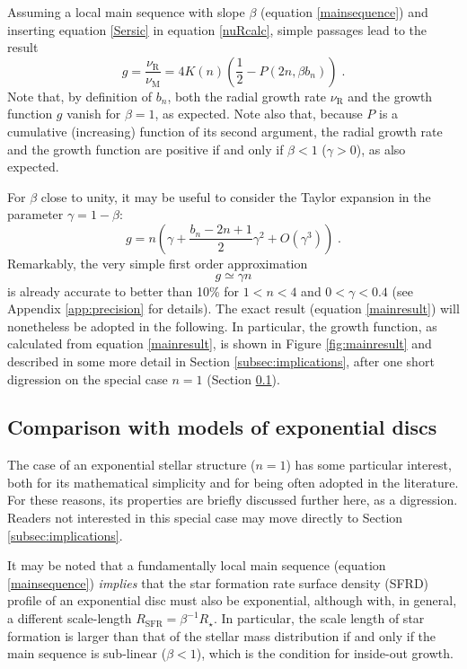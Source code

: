\documentclass[fleqn,usenatbib]{mnras}
\begin{document}
Assuming a local main sequence with slope $\beta$ (equation \ref{mainsequence}) and inserting equation \eqref{Sersic} in equation \eqref{nuRcalc}, simple passages lead to the result
\begin{equation}\label{mainresult}
g = \frac{\nu_\textrm{R}}{\nu_\textrm{M}} = 4 K(n) \left( \frac{1}{2} - P(2n, \beta b_n) \right) \;.
\end{equation}
Note that, by definition of $b_n$, both the radial growth rate $\nu_\textrm{R}$ and the growth function $g$ vanish  for $\beta = 1$, as expected. Note also that, because $P$ is a cumulative (increasing) function of its second argument, the radial growth rate and the growth function are positive if and only if $\beta < 1$ ($\gamma > 0$), as also expected.

For $\beta$ close to unity, it may be useful to consider the Taylor expansion in the parameter $\gamma = 1-\beta$:
\begin{equation}\label{Taylor}
g = n \left( \gamma + \frac{b_n - 2n +1}{2} \gamma^2 + O(\gamma^3) \right) \; .
\end{equation}
Remarkably, the very simple first order approximation
\begin{equation}\label{approx}
g \simeq \gamma n
\end{equation}
is already accurate to better than 10\% for $1 < n  < 4$ and $ 0 < \gamma < 0.4$ (see Appendix \ref{app:precision} for details). The exact result (equation \ref{mainresult}) will nonetheless be adopted in the following. In particular, the growth function, as calculated from equation \eqref{mainresult}, is shown in Figure \ref{fig:mainresult} and described in some more detail in Section \ref{subsec:implications}, after one short digression on the special case $n=1$ (Section \ref{subsec:exponential}). 


\subsection{Comparison with models of exponential discs}\label{subsec:exponential}

The case of an exponential stellar structure ($n=1$) has some particular interest, both for its mathematical simplicity and for being often adopted in the literature. For these reasons, its properties are briefly discussed further here, as a digression. Readers not interested in this special case may move directly to Section \ref{subsec:implications}.

It may be noted that a fundamentally local main sequence (equation \ref{mainsequence}) \emph{implies} that the star formation rate surface density (SFRD) profile of an exponential disc must also be exponential, although with, in general, a different scale-length $R_\textrm{SFR} = \beta^{-1} R_\star$. In particular, the scale length of star formation is larger than that of the stellar mass distribution if and only if the main sequence is sub-linear ($\beta < 1$), which is the condition for inside-out growth.
\end{document}
